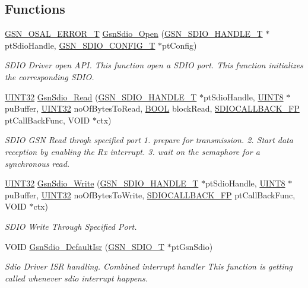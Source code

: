 \subsection*{Functions}
\begin{DoxyCompactItemize}
\item 
\hyperlink{a00659_ga36216a7aacd1d5024bc7b8bf39c3f46b}{GSN\_\-OSAL\_\-ERROR\_\-T} \hyperlink{a00653_ga8759149a411f2bab32619807abc882b6}{GsnSdio\_\-Open} (\hyperlink{a00224}{GSN\_\-SDIO\_\-HANDLE\_\-T} $\ast$ptSdioHandle, \hyperlink{a00226}{GSN\_\-SDIO\_\-CONFIG\_\-T} $\ast$ptConfig)
\begin{DoxyCompactList}\small\item\em SDIO Driver open API. This function open a SDIO port. This function initializes the corresponding SDIO. \end{DoxyCompactList}\item 
\hyperlink{a00660_gae1e6edbbc26d6fbc71a90190d0266018}{UINT32} \hyperlink{a00653_gaef9addfeef70518b7326d2cb8d7fe435}{GsnSdio\_\-Read} (\hyperlink{a00224}{GSN\_\-SDIO\_\-HANDLE\_\-T} $\ast$ptSdioHandle, \hyperlink{a00660_gab27e9918b538ce9d8ca692479b375b6a}{UINT8} $\ast$puBuffer, \hyperlink{a00660_gae1e6edbbc26d6fbc71a90190d0266018}{UINT32} noOfBytesToRead, \hyperlink{a00660_ga1f04022c0a182c51c059438790ea138c}{BOOL} blockRead, \hyperlink{a00584_ac80005f1e9ff1e1e884583938336474b}{SDIOCALLBACK\_\-FP} ptCallBackFunc, VOID $\ast$ctx)
\begin{DoxyCompactList}\small\item\em SDIO GSN Read throgh specified port 1. prepare for transmission. 2. Start data reception by enabling the Rx interrupt. 3. wait on the semaphore for a synchronous read. \end{DoxyCompactList}\item 
\hyperlink{a00660_gae1e6edbbc26d6fbc71a90190d0266018}{UINT32} \hyperlink{a00653_ga1f7657660110943adae4d9ca818afbb5}{GsnSdio\_\-Write} (\hyperlink{a00224}{GSN\_\-SDIO\_\-HANDLE\_\-T} $\ast$ptSdioHandle, \hyperlink{a00660_gab27e9918b538ce9d8ca692479b375b6a}{UINT8} $\ast$puBuffer, \hyperlink{a00660_gae1e6edbbc26d6fbc71a90190d0266018}{UINT32} noOfBytesToWrite, \hyperlink{a00584_ac80005f1e9ff1e1e884583938336474b}{SDIOCALLBACK\_\-FP} ptCallBackFunc, VOID $\ast$ctx)
\begin{DoxyCompactList}\small\item\em SDIO Write Through Specified Port. \end{DoxyCompactList}\item 
VOID \hyperlink{a00653_ga2e2284223c578c2adc1675b6aad5d1f3}{GsnSdio\_\-DefaultIsr} (\hyperlink{a00216}{GSN\_\-SDIO\_\-T} $\ast$ptGsnSdio)
\begin{DoxyCompactList}\small\item\em Sdio Driver ISR handling. Combined interrupt handler This function is getting called whenever sdio interrupt happens. \end{DoxyCompactList}\end{DoxyCompactItemize}


